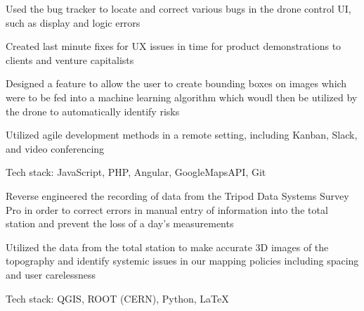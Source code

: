 \documentclass[letterpaper]{resume}
\begin{document}
\begin{compactitem}
\item Used the bug tracker to locate and correct various bugs in the drone control UI, such as display and logic errors
\item Created last minute fixes for UX issues in time for product demonstrations to clients and venture capitalists
\item Designed a feature to allow the user to create bounding boxes on images which were to be fed into a machine learning algorithm which woudl then be utilized by the drone to automatically identify risks
\item Utilized agile development methods in a remote setting, including Kanban, Slack, and video conferencing
\item Tech stack: JavaScript, PHP, Angular, GoogleMapsAPI, Git
\end{compactitem}

\begin{compactitem}
\item Reverse engineered the recording of data from the Tripod Data Systems Survey Pro in order to correct errors in manual entry of information into the total station and prevent the loss of a day's measurements
\item Utilized the data from the total station to make accurate 3D images of the topography and identify systemic issues in our mapping policies including spacing and user carelessness
\item Tech stack: QGIS, ROOT (CERN), Python, LaTeX
\end{compactitem}
\end{document}
